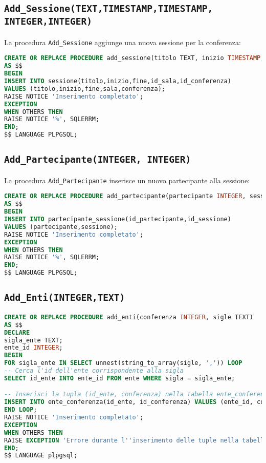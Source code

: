 \subsection{\texttt{Add\_Sessione(TEXT,TIMESTAMP,TIMESTAMP, INTEGER,INTEGER)}}
La procedura \texttt{Add\_Sessione} aggiunge una nuova sessione per la conferenza:
\begin{lstlisting}[language=SQL, style=mystyle]
CREATE OR REPLACE PROCEDURE add_sessione(titolo TEXT, inizio TIMESTAMP, fine TIMESTAMP, sala INTEGER, conferenza INTEGER)
AS $$
BEGIN
INSERT INTO sessione(titolo,inizio,fine,id_sala,id_conferenza)
VALUES (titolo,inizio,fine,sala,conferenza);
RAISE NOTICE 'Inserimento completato';
EXCEPTION
WHEN OTHERS THEN
RAISE NOTICE '%', SQLERRM;
END;
$$ LANGUAGE PLPGSQL;
\end{lstlisting}
\subsection{\texttt{Add\_Partecipante(INTEGER, INTEGER)}}
La procedura \texttt{Add\_Partecipante} inserisce un nuovo partecipante alla sessione:
\begin{lstlisting}[language=SQL, style=mystyle]
CREATE OR REPLACE PROCEDURE add_partecipante(partecipante INTEGER, sessione INTEGER)
AS $$
BEGIN
INSERT INTO partecipante_sessione(id_partecipante,id_sessione)
VALUES (partecipante,sessione);
RAISE NOTICE 'Inserimento completato';
EXCEPTION
WHEN OTHERS THEN
RAISE NOTICE '%', SQLERRM;
END;
$$ LANGUAGE PLPGSQL;
\end{lstlisting}
\subsection{\texttt{Add\_Enti(INTEGER,TEXT)}}
\begin{lstlisting}[language=SQL,style=mystyle]
CREATE OR REPLACE PROCEDURE add_enti(conferenza INTEGER, sigle TEXT)
AS $$
DECLARE
sigla_ente TEXT;
ente_id INTEGER;
BEGIN
FOR sigla_ente IN SELECT unnest(string_to_array(sigle, ',')) LOOP
-- Cerca l'id dell'ente corrispondente alla sigla
SELECT id_ente INTO ente_id FROM ente WHERE sigla = sigla_ente;

-- Inserisci la tupla (id_ente, conferenza) nella tabella ente_conferenza
INSERT INTO ente_conferenza(id_ente, id_conferenza) VALUES (ente_id, conferenza);
END LOOP;
RAISE NOTICE 'Inserimento completato';
EXCEPTION
WHEN OTHERS THEN
RAISE EXCEPTION 'Errore durante l''inserimento delle tuple nella tabella ente_conferenza: %', SQLERRM;
END;
$$ LANGUAGE plpgsql;
\end{lstlisting}
